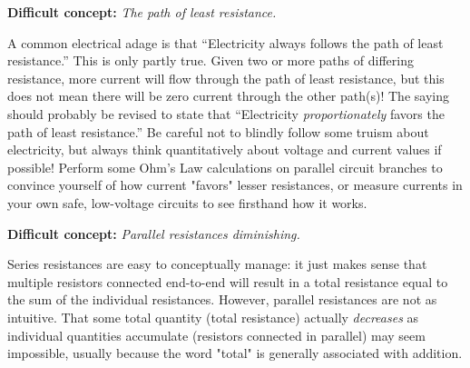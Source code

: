 \vskip 10pt

\noindent
{\bf Difficult concept: } {\it The path of least resistance.}

A common electrical adage is that ``Electricity always follows the path of least resistance.''  This is only partly true.  Given two or more paths of differing resistance, more current will flow through the path of least resistance, but this does not mean there will be zero current through the other path(s)!  The saying should probably be revised to state that ``Electricity {\it proportionately} favors the path of least resistance.''  Be careful not to blindly follow some truism about electricity, but always think quantitatively about voltage and current values if possible!  Perform some Ohm's Law calculations on parallel circuit branches to convince yourself of how current "favors" lesser resistances, or measure currents in your own safe, low-voltage circuits to see firsthand how it works.

\vskip 10pt

\noindent
{\bf Difficult concept: } {\it Parallel resistances diminishing.}

Series resistances are easy to conceptually manage: it just makes sense that multiple resistors connected end-to-end will result in a total resistance equal to the sum of the individual resistances.  However, parallel resistances are not as intuitive.  That some total quantity (total resistance) actually {\it decreases} as individual quantities accumulate (resistors connected in parallel) may seem impossible, usually because the word "total" is generally associated with addition.

